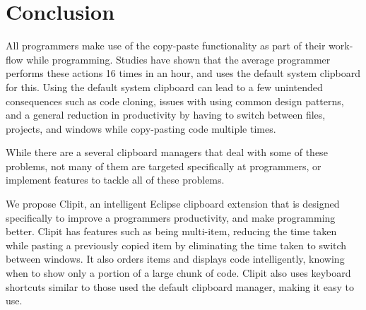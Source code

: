 \documentclass{acm_proc_article-sp}
\begin{document}
\section{Conclusion}
All programmers make use of the copy-paste functionality as part of their work-flow while programming. Studies have shown that the average programmer performs these actions 16 times in an hour, and uses the default system clipboard for this. Using the default system clipboard can lead to a few unintended consequences such as code cloning, issues with using common design patterns, and a general reduction in productivity by having to switch between files, projects, and windows while copy-pasting code multiple times.

While there are a several clipboard managers that deal with some of these problems, not many of them are targeted specifically at programmers, or implement features to tackle all of these problems.

We propose Clipit, an intelligent Eclipse clipboard extension that is designed specifically to improve a programmers productivity, and make programming better. Clipit has features such as being multi-item, reducing the time taken while pasting a previously copied item by eliminating the time taken to switch between windows. It also orders items and displays code intelligently, knowing when to show only a portion of a large chunk of code. Clipit also uses keyboard shortcuts similar to those used the default clipboard manager, making it easy to use. 




\end{document}
